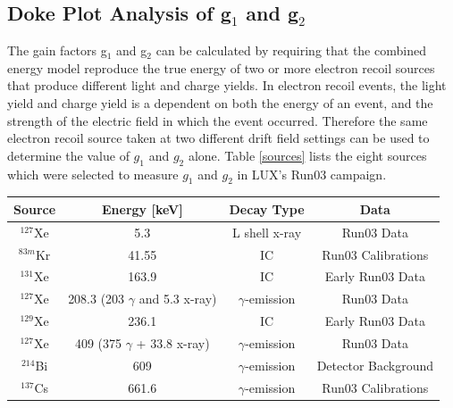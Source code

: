 \documentclass[a4paper,12pt]{article}
\begin{document}
{\subsection{Doke Plot Analysis of g$_1$ and g$_2$}

The gain factors g$_1$ and g$_2$ can be calculated by requiring that the combined energy model reproduce the true energy of two or more electron recoil sources that produce different light and charge yields.  In electron recoil events, the light yield and charge yield is a dependent on both the energy of an event, and the strength of the electric field in which the event occurred.  Therefore the same electron recoil source taken at two different drift field settings can be used to determine the value of $g_1$ and $g_2$ alone. Table \ref{sources} lists the eight sources which were selected to measure $g_1$ and $g_2$ in LUX's Run03 campaign.  


\begin{center}
\begin{tabular}{ | c| c | c | c | }
\hline
Source & Energy [keV] & Decay Type & Data \\ \hline
$^{127}$Xe & 5.3 & L shell x-ray & Run03 Data \\ \hline
$^{83m}$Kr & 41.55 & IC & Run03 Calibrations \\  \hline
$^{131}$Xe & 163.9 & IC & Early Run03 Data \\  \hline
$^{127}$Xe & 208.3 (203 $\gamma$ and 5.3 x-ray) & $\gamma$-emission & Run03 Data \\  \hline
$^{129}$Xe & 236.1 & IC & Early Run03 Data  \\  \hline
$^{127}$Xe & 409 (375 $\gamma$ + 33.8 x-ray) & $\gamma$-emission & Run03 Data \\  \hline
$^{214}$Bi & 609 & $\gamma$-emission & Detector Background \\  \hline
$^{137}$Cs & 661.6 & $\gamma$-emission & Run03 Calibrations \\
\hline
\end{tabular}
\label{sources}
\end{center}

}
\end{document}
